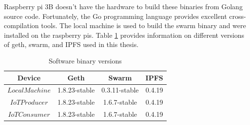\documentclass[11pt,openright]{report}
\begin{document}
Raspberry pi 3B doesn't have the hardware to build these binaries from Golang source code. Fortunately, the Go programming language provides excellent cross-compilation tools. The local machine is used to build the swarm binary and were installed on the raspberry pis. 
\newline
\newline
Table \ref{software_version} provides information on different versions of geth, swarm, and IPFS used in this thesis.
\newline
\newline
\begin{table}[!htbp]
	\renewcommand{\arraystretch}{1}
	\caption{Software binary versions}
	\label{software_version}
	\centering
	\begin{tabular}{|c|c|c|c|}
		\hline
		\bfseries Device & \bfseries Geth & \bfseries Swarm  & \bfseries IPFS\\
		\hline\hline
		$Local Machine$ & 1.8.23-stable & 0.3.11-stable & 0.4.19 \\ \hline
		$IoT Producer$ & 1.8.23-stable & 1.6.7-stable & 0.4.19 \\ \hline
		$IoT Consumer$ & 1.8.23-stable & 1.6.7-stable & 0.4.19 \\ \hline
	\end{tabular}
\end{table}
\newline
\newline
\end{document}
